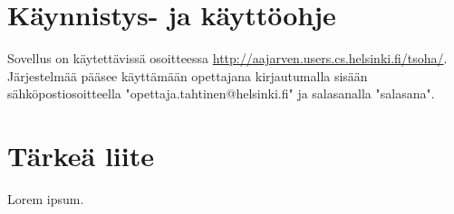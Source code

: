 \documentclass[12pt,a4paper,titlepage]{article}
\begin{document}
\section{Käynnistys- ja käyttöohje}
Sovellus on käytettävissä osoitteessa \url{http://aajarven.users.cs.helsinki.fi/tsoha/}. Järjestelmää pääsee käyttämään opettajana kirjautumalla sisään sähköpostiosoitteella "opettaja.tahtinen@helsinki.fi" ja salasanalla "salasana". 



\small


\appendix
\section{Tärkeä liite}
Lorem ipsum.
\newpage
\end{document}
